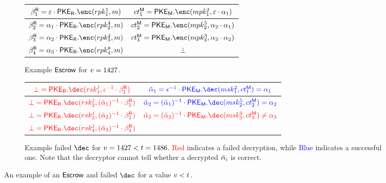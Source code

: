 \begin{figure}[ht]
	\centering
	\begin{tcolorbox}[sharp corners,colback=white,boxrule=0.3mm,left=1mm]
		\begin{subfigure}{\textwidth}
			\centering
			\begin{tabular}{|c|c|}
				\hline
				$\otpct_1^\rev =  \varepsilon \cdot \pker.\enc(\revpk^1_1, m) $
				 & $ct^\mat_1 =  \pkem.\enc(\matpk^{2}_1, \varepsilon \cdot \alpha_1) $ \\
				\hline
				$\otpct_2^\rev= \alpha_1 \cdot \pker.\enc(\revpk^4_2, m ) $
				 & $ct^\mat_2 =  \pkem.\enc(\matpk^5_2, \alpha_2 \cdot \alpha_1) $      \\
				\hline
				$\otpct_3^\rev=  \alpha_2 \cdot \pker.\enc(\revpk^2_3, m) $
				 & $ct^\mat_3 =  \pkem.\enc(\matpk^3_3, \alpha_3 \cdot \alpha_2) $      \\
				\hline
				$\otpct_4^\rev =  \alpha_3 \cdot \pker.\enc(\revpk^8_4, m ) $
				 & $\bot$                                                               \\
				\hline
			\end{tabular}
			\caption{Example ${\sf Escrow}$ for $v = 1427$.}
		\end{subfigure}

		\vspace{1.5em}

		\begin{subfigure}{\textwidth}
			\centering
			\begin{tabular}{|c|c|}
				\hline
				$\textcolor{red}{\bot =  \pker.\dec(\revsk^j_1, \epsilon^{-1} \cdot \otpct^\rev_1)} $
				 & $\textcolor{blue}{\tilde{\otpk}_1 =  \epsilon^{-1} \cdot \pkem.\dec(\matsk^{2}_1, ct^\mat_1) =\alpha_1} $             \\
				\hline
				$\textcolor{red}{\bot =  \pker.\dec(\revsk^j_{2}, (\tilde{\otpk}_1)^{-1} \cdot \otpct^{\rev}_2)}$
				 & $ \textcolor{blue}{\tilde{\otpk}_2 =  (\tilde{\otpk}_1)^{-1} \cdot \pkem.\dec(\matsk^5_2, ct^\mat_2)   =\alpha_2}$    \\
				\hline
				$\textcolor{red}{\bot =  \pker.\dec(\revsk^j_3, (\tilde{\otpk}_2)^{-1} \cdot \otpct^{\rev}_3)} $
				 & $\textcolor{red}{\tilde{\otpk}_3 =  (\tilde{\otpk}_2)^{-1} \cdot \pkem.\dec(\matsk^9_3, ct^\mat_3)  \neq \alpha_3 } $ \\
				\hline
				$\textcolor{red}{\bot =  \pker.\dec(\revsk^j_4, (\tilde{\otpk}_3)^{-1} \cdot \otpct^{\rev}_4)} $
				 &                                                                                                                       \\
				\hline
			\end{tabular}
			\caption{Example failed $\dec$ for $v = 1427 < t = 1486$. \textcolor{red}{Red} indicates a failed decryption, while \textcolor{blue}{Blue} indicates a successful one. Note that the decryptor cannot tell whether a decrypted $\tilde{\alpha}_i$ is correct.}
		\end{subfigure}
	\end{tcolorbox}
	\caption{An example of an ${\sf Escrow}$ and failed $\dec$ for a value $v < t$.}
	\label{fig:failed_dec_example}
\end{figure}

